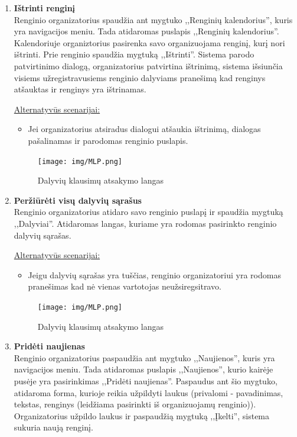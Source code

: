 \documentclass{VUMIFPSkursinis}
\begin{document}
\begin{enumerate} [label = \textbf{U\arabic*.}]
			\item \textbf{Ištrinti renginį}   \\
					Renginio organizatorius spaudžia ant mygtuko ,,Renginių kalendorius'', kuris yra navigacijos meniu. Tada atidaromas puslapis ,,Renginių kalendorius''. Kalendoriuje organiztorius pasirenka savo organizuojama renginį, kurį nori ištrinti. Prie renginio spaudžia mygtuką ,,Ištrinti''. Sistema parodo patvirtinimo dialogą, organizatorius patvirtina ištrinimą, sistema išsiunčia visiems užregistravusiems renginio dalyviams pranešimą kad renginys atšauktas ir renginys yra ištrinamas.
					
					\underline{Alternatyvūs scenarijai:}
					\begin{itemize}
						\item Jei organizatorius atsiradus dialogui atšaukia ištrinimą, dialogas pašalinamas ir parodomas renginio puslapis.
					\end{itemize}
				
				\begin{figure}[H]
					\centering
					\texttt{[image: img/MLP.png]}
					\caption{Dalyvių klausimų atsakymo langas}
					\label{fig:atsakyti-klausimus}
				\end{figure}	
				
			\item \textbf{Peržiūrėti visų dalyvių sąrašus}   \\
					Renginio organizatorius atidaro savo renginio puslapį ir spaudžia mygtuką ,,Dalyviai''. Atidaromas langas, kuriame yra rodomas pasirinkto renginio dalyvių sąrašas.
					
					\underline{Alternatyvūs scenarijai:}
					\begin{itemize}
						\item Jeigu dalyvių sąrašas yra tuščias, renginio organizatoriui yra rodomas pranešimas kad nė vienas vartotojas neužsiregsitravo.
					\end{itemize}
				
				\begin{figure}[H]
					\centering
					\texttt{[image: img/MLP.png]}
					\caption{Dalyvių klausimų atsakymo langas}
					\label{fig:atsakyti-klausimus}
				\end{figure}	
				
			\item \textbf{Pridėti naujienas}   \\
					Renginio organizatorius paspaudžia ant mygtuko ,,Naujienos'', kuris yra navigacijos meniu. Tada atidaromas puslapis ,,Naujienos'', kurio kairėje pusėje yra pasirinkimas ,,Pridėti naujienas''. Paspaudus ant šio mygtuko, atidaroma forma, kurioje reikia užpildyti laukus (privalomi - pavadinimas, tekstas, renginys (leidžiama pasirinkti iš organizuojamų renginio)). Organizatorius užpildo laukus ir paspaudžią mygtuką ,,Įkelti'', sistema sukuria naują renginį.
					

\end{enumerate}
\end{document}
